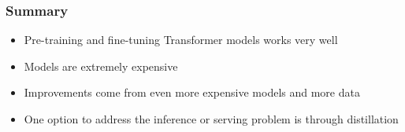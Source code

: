 \documentclass[11pt]{article}
\begin{document}
\subsubsection{Summary}
\begin{itemize}
	\item Pre-training and fine-tuning Transformer models works very well
	\item Models are extremely expensive
	\item Improvements come from even more expensive models and more data
	\item One option to address the inference or serving problem is through distillation
\end{itemize}


\clearpage
\printbibliography
\end{document}
